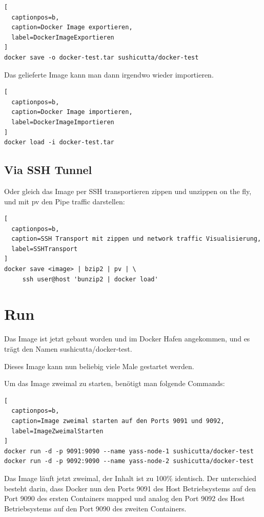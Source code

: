 \begin{lstlisting}[
  captionpos=b,
  caption=Docker Image exportieren,
  label=DockerImageExportieren
]
docker save -o docker-test.tar sushicutta/docker-test
\end{lstlisting}

Das gelieferte Image kann man dann irgendwo wieder importieren.
\\

\begin{lstlisting}[
  captionpos=b,
  caption=Docker Image importieren,
  label=DockerImageImportieren
]
docker load -i docker-test.tar
\end{lstlisting}

\subsection{Via SSH Tunnel}

Oder gleich das Image per SSH transportieren zippen und unzippen on the fly, und mit pv den
Pipe traffic darstellen:
\\

\begin{lstlisting}[
  captionpos=b,
  caption=SSH Transport mit zippen und network traffic Visualisierung,
  label=SSHTransport
]
docker save <image> | bzip2 | pv | \
     ssh user@host 'bunzip2 | docker load'
\end{lstlisting}

\section{Run}

Das Image ist jetzt gebaut worden und im Docker Hafen angekommen, und es trägt den Namen
sushicutta/docker-test.

Dieses Image kann nun beliebig viele Male gestartet werden.

Um das Image zweimal zu starten, benötigt man folgende Commands:
\\

\begin{lstlisting}[
  captionpos=b,
  caption=Image zweimal starten auf den Ports 9091 und 9092,
  label=ImageZweimalStarten
]
docker run -d -p 9091:9090 --name yass-node-1 sushicutta/docker-test
docker run -d -p 9092:9090 --name yass-node-2 sushicutta/docker-test
\end{lstlisting}

Das Image läuft jetzt zweimal, der Inhalt ist zu 100\% identisch. Der unterschied
besteht darin, dass Docker nun den Ports 9091 des Host Betriebsystems auf den Port 9090 des
ersten Containers mapped und analog den Port 9092 des Host Betriebsystems auf den Port 9090
des zweiten Containers.

